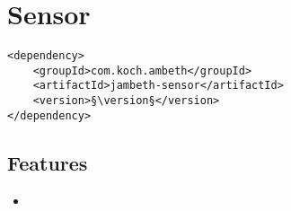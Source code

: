 \section{Sensor}
\label{module:Sensor}
\ClearAPI
\TODO
\begin{lstlisting}[style=POM,caption={Maven modules to use \emph{Ambeth Sensor}}]
<dependency>
	<groupId>com.koch.ambeth</groupId>
	<artifactId>jambeth-sensor</artifactId>
	<version>§\version§</version>
</dependency>
\end{lstlisting}
\subsection{Features}
\begin{itemize}
	\item \TODO
\end{itemize}

